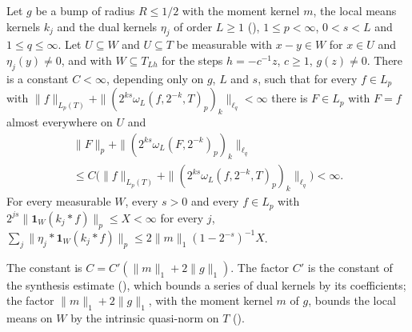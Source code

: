 \begin{theorem}
\label{thm:local-extension}
\leanok
{}
Let $g$ be a bump of radius $R \leq 1/2$ with the moment kernel $m$, the local means kernels $k_j$
and the dual kernels $\eta_j$ of order $L \geq 1$ (), $1 \leq p < \infty$,
$0 < s < L$ and $1 \leq q \leq \infty$. Let $U \subseteq W$ and $U \subseteq T$ be measurable with
$x - y \in W$ for $x \in U$ and $\eta_j(y) \neq 0$, and with $W \subseteq T_{Lh}$ for the steps
$h = -c^{-1} z$, $c \geq 1$, $g(z) \neq 0$. There is a constant $C < \infty$, depending only on
$g$, $L$ and $s$, such that for every $f \in L_p$ with
$\|f\|_{L_p(T)} + \|(2^{ks} \omega_L(f, 2^{-k}, T)_p)_k\|_{\ell_q} < \infty$ there is
$F \in L_p$ with $F = f$ almost everywhere on $U$ and
\begin{multline*}
  \|F\|_p + \|(2^{ks} \omega_L(F, 2^{-k})_p)_k\|_{\ell_q} \\
  \leq C \bigl( \|f\|_{L_p(T)}
    + \|(2^{ks} \omega_L(f, 2^{-k}, T)_p)_k\|_{\ell_q} \bigr) < \infty .
\end{multline*}
For every measurable $W$, every
$s > 0$ and every $f \in L_p$ with
$2^{js} \|\mathbf 1_W (k_j * f)\|_p \leq X < \infty$ for every $j$,
$\sum_j \|\eta_j * \mathbf 1_W (k_j * f)\|_p \leq 2 \|m\|_1 (1 - 2^{-s})^{-1} X$.
\end{theorem}

The constant is $C = C' (\|m\|_1 + 2 \|g\|_1)$. The factor $C'$ is the constant of the synthesis
estimate (), which bounds a series of dual kernels by its
coefficients; the factor $\|m\|_1 + 2 \|g\|_1$, with the moment kernel $m$ of $g$, bounds the
local means on $W$ by the intrinsic quasi-norm on $T$ ().

